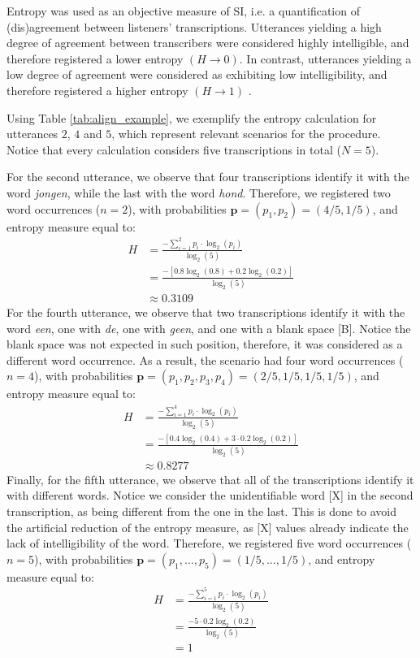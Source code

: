 Entropy was used as an objective measure of SI, i.e. a quantification of (dis)agreement between listeners' transcriptions. Utterances yielding a high degree of agreement between transcribers were considered highly intelligible, and therefore registered a lower entropy $\left( H \rightarrow 0 \right)$. In contrast, utterances yielding a low degree of agreement were considered as exhibiting low intelligibility, and therefore registered a higher entropy $\left( H \rightarrow 1 \right)$ \citep{Boonen_et_al_2021, Faes_et_al_2021}. 

Using Table \ref{tab:align_example}, we exemplify the entropy calculation for utterances $2$, $4$ and $5$, which represent relevant scenarios for the procedure. Notice that every calculation considers five transcriptions in total ($N=5$). 

For the second utterance, we observe that four transcriptions identify it with the word \textit{jongen}, while the last with the word \textit{hond}. Therefore, we registered two word occurrences ($n=2$), with probabilities $\pmb{p} = (p_{1}, p_{2}) = (4/5, 1/5)$, and entropy measure equal to:
%
\begin{align*}
	H &= \frac{-\sum_{i=1}^{2} p_{i} \cdot \log_{2}(p_{i})}{\log_{2}(5)} \\
	&= \frac{- \left[ 0.8 \log_{2}(0.8) + 0.2 \log_{2}(0.2) \right] }{\log_{2}(5)} \\
	&\approx 0.3109
\end{align*} 
%
For the fourth utterance, we observe that two transcriptions identify it with the word \textit{een}, one with \textit{de}, one with \textit{geen}, and one with a blank space [B]. Notice the blank space was not expected in such position, therefore, it was considered as a different word occurrence. As a result, the scenario had four word occurrences ($n=4$), with probabilities $\pmb{p} = (p_{1}, p_{2}, p_{3}, p_{4}) = (2/5, 1/5, 1/5, 1/5)$, and entropy measure equal to:
%
\begin{align*}
	H &= \frac{-\sum_{i=1}^{4} p_{i} \cdot \log_{2}(p_{i})}{\log_{2}(5)} \\
	&= \frac{- \left[ 0.4 \log_{2}(0.4) + 3 \cdot 0.2 \log_{2}(0.2) \right] }{\log_{2}(5)} \\
	&\approx 0.8277
\end{align*} 
%
Finally, for the fifth utterance, we observe that all of the  transcriptions identify it with different words. Notice we consider the unidentifiable word [X] in the second transcription, as being different from the one in the last. This is done to avoid the artificial reduction of the entropy measure, as [X] values already indicate the lack of intelligibility of the word. Therefore, we registered five word occurrences ($n=5$), with probabilities $\pmb{p} = (p_{1}, \dots, p_{5}) = (1/5, \dots, 1/5)$, and entropy measure equal to:
%
\begin{align*}
	H &= \frac{-\sum_{i=1}^{5} p_{i} \cdot \log_{2}(p_{i})}{\log_{2}(5)} \\
	&= \frac{- 5 \cdot 0.2 \log_{2}(0.2) }{\log_{2}(5)} \\
	&= 1
\end{align*} 
%
%
